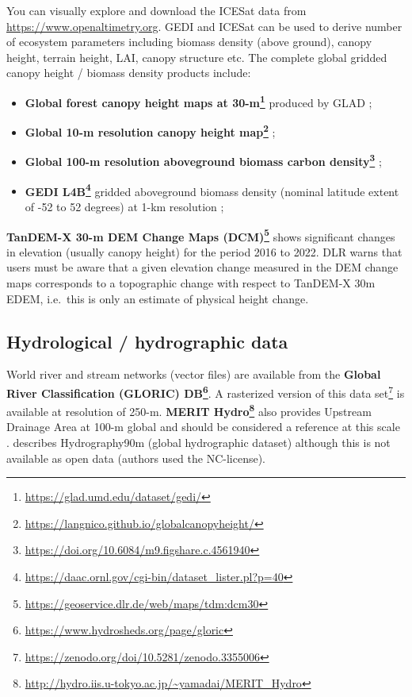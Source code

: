 \documentclass[
  graybox,natbib,nospthms]{svmono}
\providecommand{\tightlist}{%
  \setlength{\itemsep}{0pt}\setlength{\parskip}{0pt}}
\providecommand{\tightlist}{\setlength{\itemsep}{0pt}\setlength{\parskip}{0pt}}
\renewcommand{\href}[2]{#2 (\url{#1})}
\renewcommand{\href}[2]{#2\footnote{\url{#1}}}
\begin{document}
You can visually explore and download the ICESat data from \url{https://www.openaltimetry.org}.
GEDI and ICESat can be used to derive number of ecosystem parameters including biomass
density (above ground), canopy height, terrain height, LAI, canopy structure etc.
The complete global gridded canopy height / biomass density products include:

\begin{itemize}
\tightlist
\item
  \textbf{\href{https://glad.umd.edu/dataset/gedi/}{Global forest canopy height maps at 30-m}} produced by GLAD \citep{POTAPOV2021112165};
\item
  \textbf{\href{https://langnico.github.io/globalcanopyheight/}{Global 10-m resolution canopy height map}} \citep{lang2023high};
\item
  \textbf{\href{https://doi.org/10.6084/m9.figshare.c.4561940}{Global 100-m resolution aboveground biomass carbon density}} \citep{Spawn2020};
\item
  \textbf{\href{https://daac.ornl.gov/cgi-bin/dataset_lister.pl?p=40}{GEDI L4B}} gridded aboveground biomass density (nominal latitude extent of -52 to 52 degrees) at 1-km resolution \citep{Dubayah2023};
\end{itemize}

\textbf{\href{https://geoservice.dlr.de/web/maps/tdm:dcm30}{TanDEM-X 30-m DEM Change Maps (DCM)}} shows significant changes in elevation (usually canopy height) for the period 2016 to 2022.
DLR warns that users must be aware that a given elevation change measured in the DEM change maps corresponds to a topographic change with respect to TanDEM-X 30m EDEM, i.e.~this is only an estimate of physical height change.

\hypertarget{hydrological-hydrographic-data}{%
\subsection{Hydrological / hydrographic data}\label{hydrological-hydrographic-data}}

World river and stream networks (vector files) are available from the \textbf{\href{https://www.hydrosheds.org/page/gloric}{Global River Classification (GLORIC) DB}}.
A \href{https://zenodo.org/doi/10.5281/zenodo.3355006}{rasterized version of this data set} is available at resolution of 250-m.
\textbf{\href{http://hydro.iis.u-tokyo.ac.jp/~yamadai/MERIT_Hydro}{MERIT Hydro}} also provides Upstream Drainage Area at 100-m global and should be considered a reference at this scale \citep{MERITDEM}.
\citet{amatulli2022hydrography90m} describes Hydrography90m (global hydrographic dataset) although this is
not available as open data (authors used the NC-license).
\end{document}
